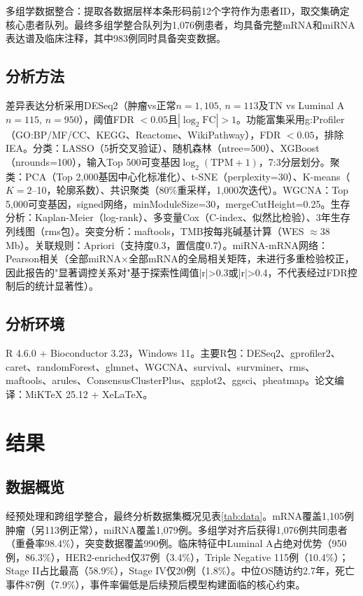 \documentclass[12pt,a4paper,openany]{ctexbook}
\begin{document}
多组学数据整合：提取各数据层样本条形码前12个字符作为患者ID，取交集确定核心患者队列。最终多组学整合队列为1,076例患者，均具备完整mRNA和miRNA表达谱及临床注释，其中983例同时具备突变数据。

\section{分析方法}
差异表达分析采用DESeq2\cite{love2014moderated}（肿瘤vs正常$n=1,105$, $n=113$及TN vs Luminal A $n=115$, $n=950$），阈值FDR $<0.05$且$|\log_2\text{FC}|>1$。功能富集采用g:Profiler\cite{kolberg2023gprofiler}（GO:BP/MF/CC、KEGG、Reactome、WikiPathway），FDR $<0.05$，排除IEA。分类：LASSO（5折交叉验证）、随机森林（ntree=500）、XGBoost（nrounds=100），输入Top 500可变基因$\log_2(\text{TPM}+1)$，7:3分层划分。聚类：PCA（Top 2,000基因中心化标准化）、t-SNE（perplexity=30）、K-means（$K=2$--10，轮廓系数）、共识聚类\cite{wilkerson2010consensus}（80\%重采样，1,000次迭代）。WGCNA\cite{langfelder2008wgcna}：Top 5,000可变基因，signed网络，minModuleSize=30，mergeCutHeight=0.25。生存分析：Kaplan-Meier（log-rank）、多变量Cox（C-index、似然比检验）、3年生存列线图（rms包）。突变分析：maftools\cite{mayakonda2018maftools}，TMB按每兆碱基计算（WES $\approx$38 Mb）。关联规则：Apriori（支持度0.3，置信度0.7）。miRNA-mRNA网络：Pearson相关（全部miRNA×全部mRNA的全局相关矩阵，未进行多重检验校正，因此报告的"显著调控关系对"基于探索性阈值|r|>0.3或|r|>0.4，不代表经过FDR控制后的统计显著性）。

\section{分析环境}
R 4.6.0 + Bioconductor 3.23，Windows 11。主要R包：DESeq2、gprofiler2、caret、randomForest、glmnet、WGCNA、survival、survminer、rms、maftools、arules、ConsensusClusterPlus、ggplot2、ggsci、pheatmap。论文编译：MiKTeX 25.12 + XeLaTeX。

\chapter{结果}

\section{数据概览}
经预处理和跨组学整合，最终分析数据集概况见表\ref{tab:data}。mRNA覆盖1,105例肿瘤（另113例正常），miRNA覆盖1,079例。多组学对齐后获得1,076例共同患者（重叠率98.4\%），突变数据覆盖990例。临床特征中Luminal A占绝对优势（950例，86.3\%），HER2-enriched仅37例（3.4\%），Triple Negative 115例（10.4\%）；Stage II占比最高（58.9\%），Stage IV仅20例（1.8\%）。中位OS随访约2.7年，死亡事件87例（7.9\%），事件率偏低是后续预后模型构建面临的核心约束。
\end{document}
